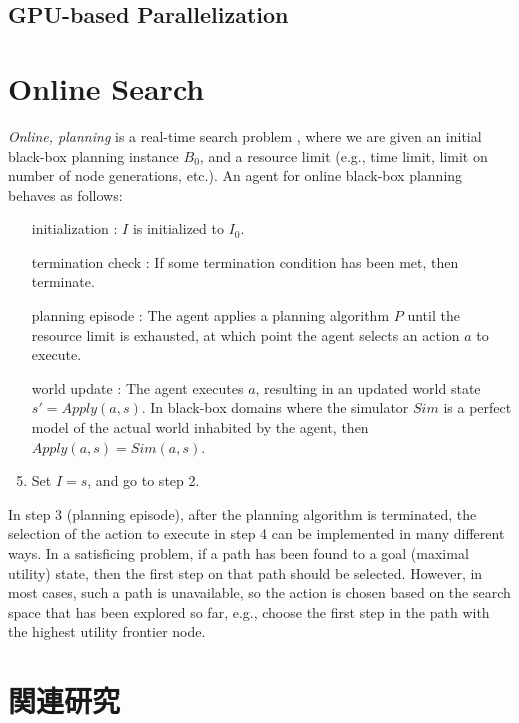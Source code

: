 \documentclass{report}
\begin{document}
\subsection{GPU-based Parallelization}


\section{Online Search}
\emph{Online, planning}  is a  real-time search  problem \cite{Korf90}, where we are given an initial black-box planning instance $B_0$, and a resource limit (e.g., time limit, limit on number of node generations, etc.).
An agent for online black-box planning behaves as follows:
\begin{enumerate}
\item [initialization]: $I$ is initialized to $I_0$.
\item [termination check]: If some termination condition has been met, then terminate.
\item [planning episode]: The agent applies a planning algorithm $P$ until the resource limit is exhausted, at which point the agent selects an action $a$ to execute.
\item [world update]: The agent executes $a$, resulting in an updated world state $s' = Apply(a,s)$. In black-box domains where the simulator $Sim$ is a perfect model of  the actual world inhabited by the agent, then $Apply(a,s) = Sim(a,s)$. 
\item Set $I= s$, and go to step 2.
\end{enumerate}

In step 3 (planning episode), after the planning algorithm is terminated, the selection of the action to execute in step 4 can be implemented in many different ways.
In a satisficing problem, if a path has been found to a goal (maximal utility) state, then the first step on that path should be selected. However, in most cases, such a path is unavailable, so the action is chosen based on the search space that has been explored so far, e.g., choose the first step in the path with the highest utility frontier node.

\section{関連研究}

\end{document}
